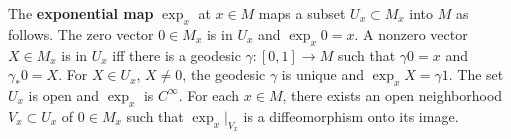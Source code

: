 The \textbf{exponential map} $\exp_x$ at $x \in M$ maps a subset $U_x \subset M_x$ into $M$ as follows. The zero vector $0 \in M_x$ is in $U_x$ and $\exp_x 0 = x$. A nonzero vector $X \in M_x$ is in $U_x$ iff there is a geodesic $\gamma: [0, 1] \rightarrow M$ such that $\gamma 0 = x$ and $\gamma_* 0 = X$. For $X \in U_x$, $X \neq 0$, the geodesic $\gamma$ is unique and $\exp_x X = \gamma 1$. The set $U_x$ is open and $\exp_x$ is $C^\infty$. For each $x \in M$, there exists an open neighborhood $V_x \subset U_x$ of $0 \in M_x$ such that $\exp_x|_{V_x}$ is a diffeomorphism onto its image.
